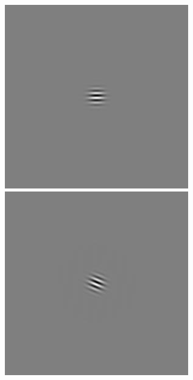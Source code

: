 \begin{figure}[ht]
\begin{center}
 \includegraphics[width=\columnwidth/9]{ch4/figures/rGabor1_4.jpg}
 \includegraphics[width=\columnwidth/9]{ch4/figures/rGabor1_5.jpg}

\end{center}
\end{figure}
